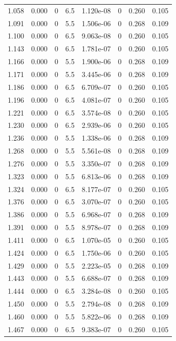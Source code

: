 \documentclass[preview]{standalone}
\begin{document}
{{{\begin{tabular}{L{1.2cm}C{1.2cm} C{0.3cm}C{0.5cm} C{1.4cm}C{1.4cm} C{1.4cm}C{1.4cm}}
  1.058  &  0.000  & 0     & 6.5 &  1.120e-08  & 0  & 0.260 &  0.105   \\ 
  1.091  &  0.000  & 0     & 5.5 &  1.506e-06  & 0  & 0.268 &  0.109   \\ 
  1.100  &  0.000  & 0     & 6.5 &  9.063e-08  & 0  & 0.260 &  0.105   \\ 
  1.143  &  0.000  & 0     & 6.5 &  1.781e-07  & 0  & 0.260 &  0.105   \\ 
  1.166  &  0.000  & 0     & 5.5 &  1.900e-06  & 0  & 0.268 &  0.109   \\ 
  1.171  &  0.000  & 0     & 5.5 &  3.445e-06  & 0  & 0.268 &  0.109   \\ 
  1.186  &  0.000  & 0     & 6.5 &  6.709e-07  & 0  & 0.260 &  0.105   \\ 
  1.196  &  0.000  & 0     & 6.5 &  4.081e-07  & 0  & 0.260 &  0.105   \\ 
  1.221  &  0.000  & 0     & 6.5 &  3.574e-08  & 0  & 0.260 &  0.105   \\ 
  1.230  &  0.000  & 0     & 6.5 &  2.939e-06  & 0  & 0.260 &  0.105   \\ 
  1.236  &  0.000  & 0     & 5.5 &  1.338e-06  & 0  & 0.268 &  0.109   \\ 
  1.268  &  0.000  & 0     & 5.5 &  5.561e-08  & 0  & 0.268 &  0.109   \\ 
  1.276  &  0.000  & 0     & 5.5 &  3.350e-07  & 0  & 0.268 &  0.109   \\ 
  1.323  &  0.000  & 0     & 5.5 &  6.813e-06  & 0  & 0.268 &  0.109   \\ 
  1.324  &  0.000  & 0     & 6.5 &  8.177e-07  & 0  & 0.260 &  0.105   \\ 
  1.376  &  0.000  & 0     & 6.5 &  3.070e-07  & 0  & 0.260 &  0.105   \\ 
  1.386  &  0.000  & 0     & 5.5 &  6.968e-07  & 0  & 0.268 &  0.109   \\ 
  1.391  &  0.000  & 0     & 5.5 &  8.978e-07  & 0  & 0.268 &  0.109   \\ 
  1.411  &  0.000  & 0     & 6.5 &  1.070e-05  & 0  & 0.260 &  0.105   \\ 
  1.424  &  0.000  & 0     & 6.5 &  1.750e-06  & 0  & 0.260 &  0.105   \\ 
  1.429  &  0.000  & 0     & 5.5 &  2.223e-05  & 0  & 0.268 &  0.109   \\ 
  1.443  &  0.000  & 0     & 5.5 &  6.688e-07  & 0  & 0.268 &  0.109   \\ 
  1.444  &  0.000  & 0     & 6.5 &  3.284e-08  & 0  & 0.260 &  0.105   \\ 
  1.450  &  0.000  & 0     & 5.5 &  2.794e-08  & 0  & 0.268 &  0.109   \\ 
  1.460  &  0.000  & 0     & 5.5 &  5.822e-06  & 0  & 0.268 &  0.109   \\ 
  1.467  &  0.000  & 0     & 6.5 &  9.383e-07  & 0  & 0.260 &  0.105   \\ 
\hline 
\end{tabular} 

}}}
\end{document}
